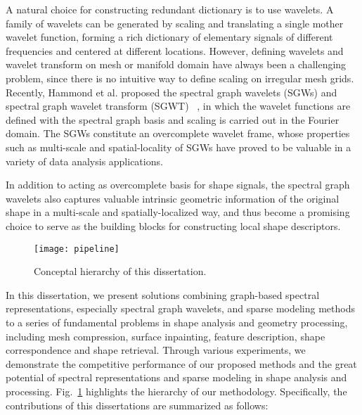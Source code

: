 A natural choice for constructing redundant dictionary is to use wavelets. A family
of wavelets can be generated by scaling and translating a single mother wavelet function,
forming a rich dictionary of elementary signals of different frequencies and centered
at different locations. However, defining wavelets and wavelet transform on mesh or
manifold domain have always been a challenging problem, since there is no intuitive way
to define scaling on irregular mesh grids. Recently, Hammond et al. proposed the spectral
graph wavelets (SGWs) and spectral graph wavelet transform (SGWT)~\cite{Hammond2011}
, in which the wavelet functions are defined with the spectral graph basis and scaling is carried
out in the Fourier domain. The SGWs constitute an overcomplete wavelet frame, whose properties
such as multi-scale and spatial-locality of SGWs have proved to be valuable in a variety of data
analysis applications.

In addition to acting as overcomplete basis for shape signals, the spectral
graph wavelets also captures valuable intrinsic geometric information of the original
shape in a multi-scale and spatially-localized way, and thus become a promising choice 
to serve as the building blocks for constructing local shape descriptors.

\begin{figure}
  \centering
  \texttt{[image: pipeline]}
  \caption[Hierarchy of this dissertation]
  {Conceptal hierarchy of this dissertation.}
  \label{fig:thesis_hierarchy}
\end{figure}

In this dissertation, we present solutions combining graph-based spectral
representations, especially spectral graph wavelets, and sparse modeling
methods to a series of fundamental problems in shape analysis and geometry 
processing, including mesh compression, surface inpainting, feature description, 
shape correspondence and shape retrieval. Through various experiments, we 
demonstrate the competitive performance of our proposed methods and the great 
potential of spectral representations and sparse modeling in shape analysis and processing. 
Fig.~\ref{fig:thesis_hierarchy} highlights the hierarchy of our methodology. 
Specifically, the contributions of this dissertations are summarized as follows:

